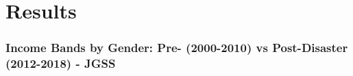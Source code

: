 \documentclass[serif, aspectratio=169]{beamer}
\begin{document}
\section{Results}

\begin{frame}[label=income_band_main]
\frametitle{Income Bands by Gender: Pre- (2000-2010) vs Post-Disaster (2012-2018) - JGSS}







\end{frame}
\end{document}
